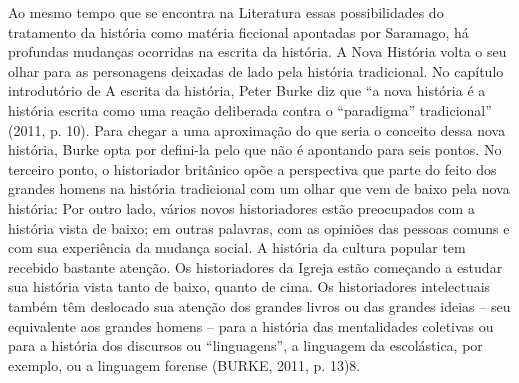 \documentclass[../DISSERTACAO_MAIN.tex]{subfiles}
\begin{document}
Ao mesmo tempo que se encontra na Literatura essas possibilidades do tratamento da história como matéria ficcional apontadas por Saramago, há profundas mudanças ocorridas na escrita da história. A Nova História volta o seu olhar para as personagens deixadas de lado pela história tradicional. No capítulo introdutório de A escrita da história, Peter Burke diz que “a nova história é a história escrita como uma reação deliberada contra o “paradigma” tradicional” (2011, p. 10). Para chegar a uma aproximação do que seria o conceito dessa nova história, Burke opta por defini-la pelo que não é apontando para seis pontos. No terceiro ponto, o historiador britânico opõe a perspectiva que parte do feito dos grandes homens na história tradicional com um olhar que vem de baixo pela nova história:
Por outro lado, vários novos historiadores estão preocupados com a história vista de baixo; em outras palavras, com as opiniões das pessoas comuns e com sua experiência da mudança social. A história da cultura popular tem recebido bastante atenção. Os historiadores da Igreja estão começando a estudar sua história vista tanto de baixo, quanto de cima. Os historiadores intelectuais também têm deslocado sua atenção dos grandes livros ou das grandes ideias – seu equivalente aos grandes homens –  para a história das mentalidades coletivas ou para a história dos discursos ou “linguagens”, a linguagem da escolástica, por exemplo, ou a linguagem forense (BURKE, 2011, p. 13)8.
\end{document}
